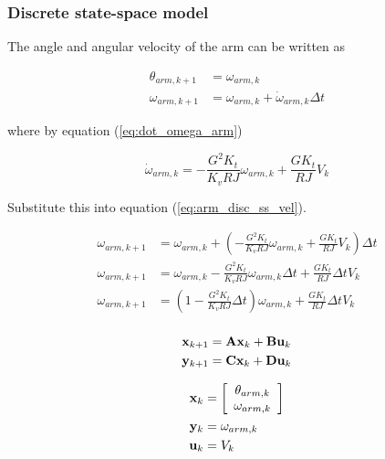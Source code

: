 \subsubsection{Discrete state-space model}

The angle and angular velocity of the arm can be written as

\begin{align}
  \theta_{arm,k+1} &= \omega_{arm,k} \label{eq:arm_disc_ss_pos} \\
  \omega_{arm,k+1} &= \omega_{arm,k} + \dot{\omega}_{arm,k} \Delta t
    \label{eq:arm_disc_ss_vel}
\end{align}

where by equation (\ref{eq:dot_omega_arm})

\begin{equation*}
  \dot{\omega}_{arm,k} = -\frac{G^2 K_t}{K_v RJ} \omega_{arm,k} +
    \frac{G K_t}{RJ} V_k
\end{equation*}

Substitute this into equation (\ref{eq:arm_disc_ss_vel}).

\begin{align}
  \omega_{arm,k+1} &= \omega_{arm,k} + \left(-\frac{G^2 K_t}{K_v RJ}
    \omega_{arm,k} + \frac{G K_t}{RJ} V_k\right) \Delta t \nonumber \\
  \omega_{arm,k+1} &= \omega_{arm,k} - \frac{G^2 K_t}{K_v RJ} \omega_{arm,k}
    \Delta t + \frac{G K_t}{RJ} \Delta t V_k \nonumber \\
  \omega_{arm,k+1} &= \left(1 - \frac{G^2 K_t}{K_v RJ} \Delta t\right)
    \omega_{arm,k} + \frac{G K_t}{RJ} \Delta t V_k \nonumber \\
\end{align}

\begin{align*}
  \mathbf{x}_{k+1} &= \mathbf{A} \mathbf{x}_k + \mathbf{B} \mathbf{u}_k \\
  \mathbf{y}_{k+1} &= \mathbf{C} \mathbf{x}_k + \mathbf{D} \mathbf{u}_k
\end{align*}

\begin{align*}
  \mathbf{x}_k &= \left[
  \begin{array}{c}
    \theta_{arm,k} \\
    \omega_{arm,k}
  \end{array}
  \right] \\
  \mathbf{y}_k &= \omega_{arm,k} \\
  \mathbf{u}_k &= V_k
\end{align*}

